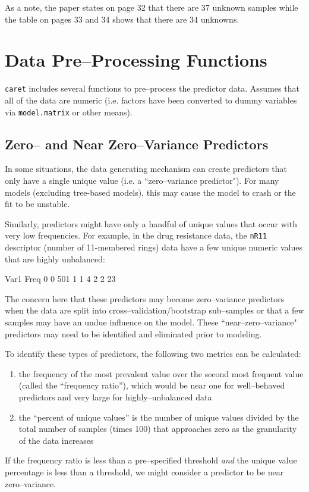 \documentclass[12pt]{article}
\begin{document}
As a note, the paper states on page 32 that there are 37 unknown samples while the table on pages 33 and 34 shows that there are 34 unknowns. 



\section{Data Pre--Processing Functions}

\texttt{caret} includes several functions to pre--process the predictor data.  Assumes that all of the data are numeric (i.e. factors have been converted to dummy variables via \texttt{model.matrix} or other means).

\subsection{Zero-- and Near Zero--Variance Predictors}

In some situations, the data generating mechanism can create predictors that only have a single unique value (i.e. a ``zero--variance predictor"). For many models (excluding tree-based models), this may cause the model to crash or the fit to be unstable. 

Similarly, predictors might have only a handful of unique values that occur with very low frequencies. For example, in the drug resistance data, the \verb+nR11+ descriptor (number of 11-membered rings) data have a few unique numeric values that are highly unbalanced:
 
\begin{Schunk}
\begin{Soutput}
  Var1 Freq
0    0  501
1    1    4
2    2   23
\end{Soutput}
\end{Schunk}

The concern here that these predictors may become zero--variance predictors when the data are split into cross--validation/bootstrap sub--samples or that a few samples may have an undue influence on the model. These ``near--zero--variance" predictors may need to be identified and eliminated prior to modeling.


To identify these types of predictors, the following two metrics can be calculated:
\begin{enumerate}
   \item the frequency of the most prevalent value over the second most frequent value (called the ``frequency ratio''), which would be near one for well--behaved predictors and very large for highly--unbalanced data
   \item the ``percent of unique values'' is the number of unique values divided by the total number of samples (times 100) that approaches zero as the granularity of the data increases
\end{enumerate}
If the frequency ratio is less than a pre--specified threshold {\em and} the unique value percentage is less than a threshold, we might consider a predictor to be near zero--variance.
\end{document}
